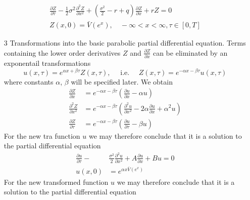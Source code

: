 \documentclass[a4paper]{article}
\begin{document}
\begin{itemize}
\begin{equation}
    \begin{array}{l}
    {\frac{\partial Z}{\partial \tau}-\frac{1}{2} \sigma^{2} \frac{\partial^{2} Z}{\partial x^{2}}+\left(\frac{\sigma^{2}}{2}-r+q\right) \frac{\partial Z}{\partial x}+r Z=0} \\
    {Z(x, 0)=\bar{V}\left(e^{x}\right), \quad-\infty<x<\infty, \tau \in[0, T]}
    \end{array}
\end{equation}
    \item[3] Transformations into the basic parabolic partial differential equation. Terms containing the lower order derivatives $Z$ and $\frac{\partial Z}{\partial x}$ can be eliminated by an exponentail 
transformations 
\begin{equation}
    u(x, \tau)=e^{\alpha x+\beta \tau} Z(x, \tau), \quad \text { i.e. } \quad Z(x, \tau)=e^{-\alpha x-\beta \tau} u(x, \tau)
\end{equation}
where constants $\alpha$, $\beta$ will be specified later. We obtain 
\begin{equation}
    \begin{aligned}
    \frac{\partial Z}{\partial x} &=e^{-\alpha x-\beta \tau}\left(\frac{\partial u}{\partial x}-\alpha u\right) \\
    \frac{\partial^{2} Z}{\partial x^{2}} &=e^{-\alpha x-\beta \tau}\left(\frac{\partial^{2} u}{\partial x^{2}}-2 \alpha \frac{\partial u}{\partial x}+\alpha^{2} u\right) \\
    \frac{\partial Z}{\partial \tau} &=e^{-\alpha x-\beta \tau}\left(\frac{\partial u}{\partial \tau}-\beta u\right)
    \end{aligned}
\end{equation}
For the new tra function $u$ we may therefore conclude that it is a solution to the partial differential equation
\begin{equation}
    \begin{aligned}
    \frac{\partial u}{\partial \tau}-& \frac{\sigma^{2}}{2} \frac{\partial^{2} u}{\partial x^{2}}+A \frac{\partial u}{\partial x}+B u=0 \\
    u(x, 0) &=e^{\alpha x \bar{V}\left(e^{x}\right)}
    \end{aligned}
\end{equation}
For the new transformed function $u$ we may therefore conclude that it is a solution to the partial differential equation
\begin{equation}
    \begin{aligned}

\end{aligned}
\end{equation}
\end{itemize}
\end{document}
